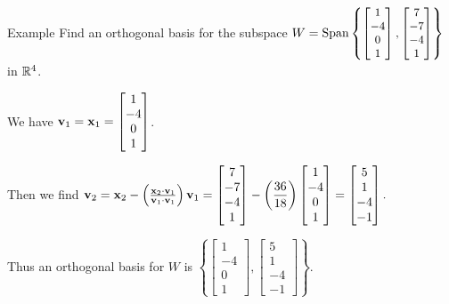 \documentclass[xcolor=dvipsnames,aspectratio=169,t]{beamer}
\begin{document}
\begin{frame}{Example}
  Find an \alert{orthogonal basis} for the subspace $W = \mbox{Span} \left\{ 
  {\small \begin{bmatrix} 1 \\ -4 \\ 0 \\ 1 \end{bmatrix},
          \begin{bmatrix} 7 \\ -7 \\ -4 \\ 1 \end{bmatrix} } \right\}$ in $\mathbb{R}^4$.

  \vspace{-0.2in}

  \pause
  We have  $\mathbf{v}_1 = \mathbf{x}_1 =  \begin{bmatrix} 1 \\ -4 \\ 0 \\ 1 \end{bmatrix}$. 
  \vspace{-0.2em}

  \pause
  Then we find $ \mathbf{v}_2 = \mathbf{x}_2 - \left( \frac{ \mathbf{x}_2 \cdot \mathbf{v}_1}{\mathbf{v}_1 \cdot \mathbf{v}_1} \right) \mathbf{v}_1 = \begin{bmatrix} 7 \\ -7 \\ -4 \\ 1 \end{bmatrix} - \left( \displaystyle \frac{36}{18} \right)  \begin{bmatrix} 1 \\ -4 \\ 0 \\ 1 \end{bmatrix} = \begin{bmatrix} 5 \\ 1 \\ -4 \\ -1 \end{bmatrix}.$
  \bigskip

  Thus an \alert{orthogonal basis} for $W$ is  $\left\{  \begin{bmatrix} 1 \\ -4 \\ 0 \\ 1 \end{bmatrix} ,  \begin{bmatrix} 5 \\ 1 \\ -4 \\ -1 \end{bmatrix} \right\}$.
\end{frame}
\end{document}
